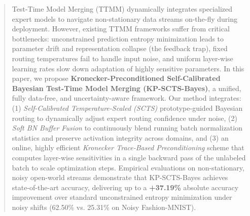 \documentclass{article}
\theoremstyle{plain}
\theoremstyle{definition}
\theoremstyle{remark}
\begin{document}

\printAffiliationsAndNotice{}

\begin{abstract}
Test-Time Model Merging (TTMM) dynamically integrates specialized expert models to navigate non-stationary data streams on-the-fly during deployment. However, existing TTMM frameworks suffer from critical bottlenecks: unconstrained prediction entropy minimization leads to parameter drift and representation collapse (the feedback trap), fixed routing temperatures fail to handle input noise, and uniform layer-wise learning rates slow down adaptation of highly sensitive parameters. In this paper, we propose \textbf{Kronecker-Preconditioned Self-Calibrated Bayesian Test-Time Model Merging (KP-SCTS-Bayes)}, a unified, fully data-free, and uncertainty-aware framework. Our method integrates: (1) \textit{Self-Calibrated Temperature-Scaled (SCTS)} prototype-guided Bayesian routing to dynamically adjust expert routing confidence under noise, (2) \textit{Soft BN Buffer Fusion} to continuously blend running batch normalization statistics and preserve activation integrity across domains, and (3) an online, highly efficient \textit{Kronecker Trace-Based Preconditioning} scheme that computes layer-wise sensitivities in a single backward pass of the unlabeled batch to scale optimization steps. Empirical evaluations on non-stationary, noisy open-world streams demonstrate that KP-SCTS-Bayes achieves state-of-the-art accuracy, delivering up to a \textbf{+37.19\%} absolute accuracy improvement over standard unconstrained entropy minimization under noisy shifts (62.50\% vs. 25.31\% on Noisy Fashion-MNIST).
\end{abstract}
\end{document}
